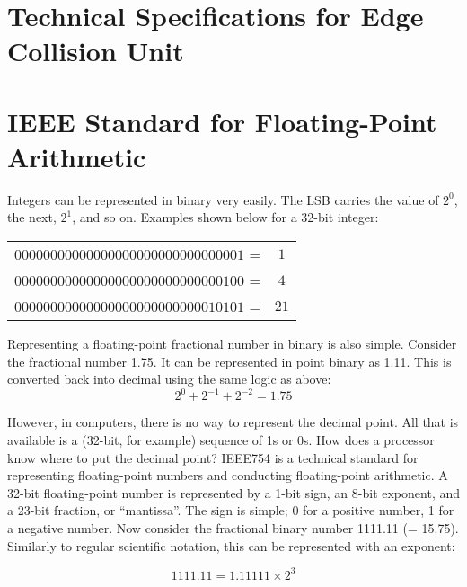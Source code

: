 
\newpage
\section{Technical Specifications for Edge Collision Unit}
    

\newpage
\section{IEEE Standard for Floating-Point Arithmetic}
\label{section:honeybee_appendix_ieee}
    Integers can be represented in binary very easily. The \gls{LSB} carries the value of $2^0$, the next, $2^1$, and so on. Examples shown below for a 32-bit integer:\\

    \begin{centering}
    \begin{tabular}{c c}
    $00000000 00000000 00000000 00000001$ = & $1$ \\
    $00000000 00000000 00000000 00000100$ = & $4$ \\
    $00000000 00000000 00000000 00010101$ = & $21$ \\
    \end{tabular}
    \end{centering}

    Representing a floating-point fractional number in binary is also simple. Consider the fractional number 1.75. It can be represented in point binary as 1.11. This is converted back into decimal using the same logic as above:
    $$2^0 + 2^{-1} + 2^{-2} = 1.75 $$

    However, in computers, there is no way to represent the decimal point. All that is available is a (32-bit, for example) sequence of 1s or 0s. How does a processor know where to put the decimal point? \gls{IEEE754} is a technical standard for representing floating-point numbers and conducting floating-point arithmetic.
    A 32-bit floating-point number is represented by a 1-bit sign, an 8-bit exponent, and a 23-bit fraction, or ``mantissa''. The sign is simple; 0 for a positive number, 1 for a negative number. Now consider the fractional binary number 1111.11 (= 15.75). Similarly to regular scientific notation, this can be represented with an exponent:

    $$1111.11 = 1.11111 \times 2^3$$

